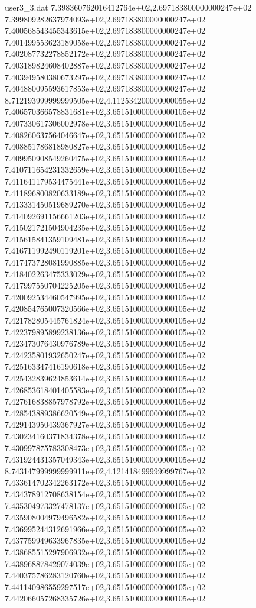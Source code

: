 \begin{filecontents}{user3_3.dat}
7.398360762016412764e+02,2.697183800000000247e+02
7.399809282637974093e+02,2.697183800000000247e+02
7.400568543455343615e+02,2.697183800000000247e+02
7.401499553623189058e+02,2.697183800000000247e+02
7.402087732278852172e+02,2.697183800000000247e+02
7.403189824608402887e+02,2.697183800000000247e+02
7.403949580380673297e+02,2.697183800000000247e+02
7.404880095593617853e+02,2.697183800000000247e+02
8.712193999999999505e+02,4.112534200000000055e+02
7.406570366578831681e+02,3.651510000000000105e+02
7.407330617306002978e+02,3.651510000000000105e+02
7.408260637564046647e+02,3.651510000000000105e+02
7.408851786818980827e+02,3.651510000000000105e+02
7.409950908549260475e+02,3.651510000000000105e+02
7.410711654231332659e+02,3.651510000000000105e+02
7.411641179534475441e+02,3.651510000000000105e+02
7.411896800820633189e+02,3.651510000000000105e+02
7.413331450519689270e+02,3.651510000000000105e+02
7.414092691156661203e+02,3.651510000000000105e+02
7.415021721504904235e+02,3.651510000000000105e+02
7.415615841359109481e+02,3.651510000000000105e+02
7.416711992490119201e+02,3.651510000000000105e+02
7.417473728081990885e+02,3.651510000000000105e+02
7.418402263475333029e+02,3.651510000000000105e+02
7.417997550704225205e+02,3.651510000000000105e+02
7.420092534460547995e+02,3.651510000000000105e+02
7.420854765007320566e+02,3.651510000000000105e+02
7.421782805445761824e+02,3.651510000000000105e+02
7.422379895899238136e+02,3.651510000000000105e+02
7.423473076430976789e+02,3.651510000000000105e+02
7.424235801932650247e+02,3.651510000000000105e+02
7.425163347416190618e+02,3.651510000000000105e+02
7.425432839624853614e+02,3.651510000000000105e+02
7.426853618401405583e+02,3.651510000000000105e+02
7.427616838857978792e+02,3.651510000000000105e+02
7.428543889386620549e+02,3.651510000000000105e+02
7.429143950439367927e+02,3.651510000000000105e+02
7.430234160371834378e+02,3.651510000000000105e+02
7.430997875783308473e+02,3.651510000000000105e+02
7.431924431357049343e+02,3.651510000000000105e+02
8.743147999999999911e+02,4.121418499999999767e+02
7.433614702342263172e+02,3.651510000000000105e+02
7.434378912708638154e+02,3.651510000000000105e+02
7.435304973327478137e+02,3.651510000000000105e+02
7.435908004979496582e+02,3.651510000000000105e+02
7.436995244312691966e+02,3.651510000000000105e+02
7.437759949633967835e+02,3.651510000000000105e+02
7.438685515297906932e+02,3.651510000000000105e+02
7.438968878429074039e+02,3.651510000000000105e+02
7.440375786283120760e+02,3.651510000000000105e+02
7.441140986559297517e+02,3.651510000000000105e+02
7.442066057268335726e+02,3.651510000000000105e+02

\end{filecontents}
